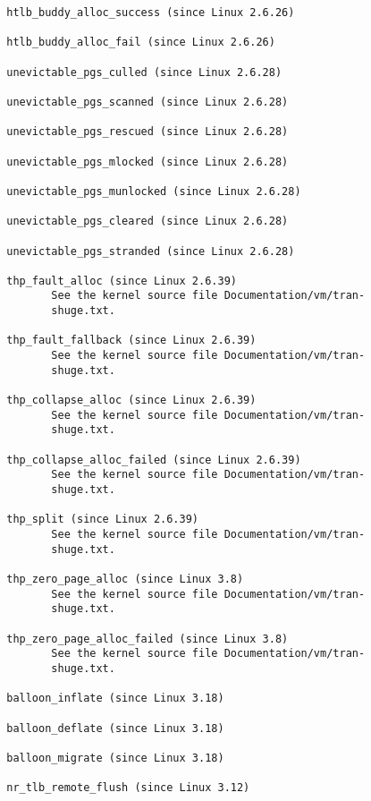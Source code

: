 \documentclass[]{article}
\begin{document}
\begin{verbatim}
              htlb_buddy_alloc_success (since Linux 2.6.26)

              htlb_buddy_alloc_fail (since Linux 2.6.26)

              unevictable_pgs_culled (since Linux 2.6.28)

              unevictable_pgs_scanned (since Linux 2.6.28)

              unevictable_pgs_rescued (since Linux 2.6.28)

              unevictable_pgs_mlocked (since Linux 2.6.28)

              unevictable_pgs_munlocked (since Linux 2.6.28)

              unevictable_pgs_cleared (since Linux 2.6.28)

              unevictable_pgs_stranded (since Linux 2.6.28)

              thp_fault_alloc (since Linux 2.6.39)
                     See the kernel source file Documentation/vm/tran‐
                     shuge.txt.

              thp_fault_fallback (since Linux 2.6.39)
                     See the kernel source file Documentation/vm/tran‐
                     shuge.txt.

              thp_collapse_alloc (since Linux 2.6.39)
                     See the kernel source file Documentation/vm/tran‐
                     shuge.txt.

              thp_collapse_alloc_failed (since Linux 2.6.39)
                     See the kernel source file Documentation/vm/tran‐
                     shuge.txt.

              thp_split (since Linux 2.6.39)
                     See the kernel source file Documentation/vm/tran‐
                     shuge.txt.

              thp_zero_page_alloc (since Linux 3.8)
                     See the kernel source file Documentation/vm/tran‐
                     shuge.txt.

              thp_zero_page_alloc_failed (since Linux 3.8)
                     See the kernel source file Documentation/vm/tran‐
                     shuge.txt.

              balloon_inflate (since Linux 3.18)

              balloon_deflate (since Linux 3.18)

              balloon_migrate (since Linux 3.18)

              nr_tlb_remote_flush (since Linux 3.12)


\end{verbatim}
\end{document}
